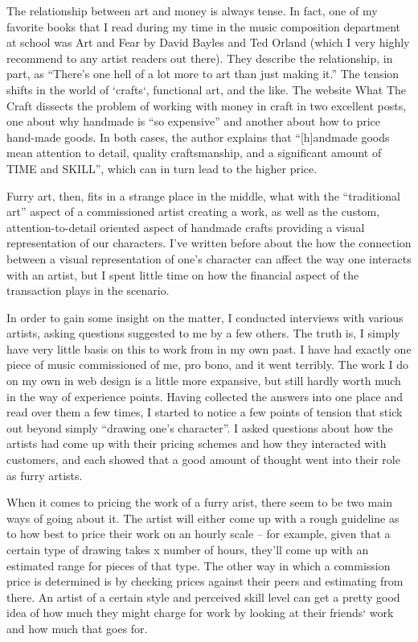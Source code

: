 
The relationship between art and money is always tense. In fact, one of my favorite books that I read during my time in the music composition department at school was Art and Fear by David Bayles and Ted Orland (which I very highly recommend to any artist readers out there).  They describe the relationship, in part, as ``There's one hell of a lot more to art than just making it.''  The tension shifts in the world of `crafts`, functional art, and the like. The website What The Craft dissects the problem of working with money in craft in two excellent posts, one about why handmade is ``so expensive'' and another about how to price hand-made goods.  In both cases, the author explains that ``[h]andmade goods mean attention to detail, quality craftsmanship, and a significant amount of TIME and SKILL'', which can in turn lead to the higher price.

Furry art, then, fits in a strange place in the middle, what with the ``traditional art'' aspect of a commissioned artist creating a work, as well as the custom, attention-to-detail oriented aspect of handmade crafts providing a visual representation of our characters. I've written before about the how the connection between a visual representation of one's character can affect the way one interacts with an artist, but I spent little time on how the financial aspect of the transaction plays in the scenario.

In order to gain some insight on the matter, I conducted interviews with various artists, asking questions suggested to me by a few others.  The truth is, I simply have very little basis on this to work from in my own past.  I have had exactly one piece of music commissioned of me, pro bono, and it went terribly.  The work I do on my own in web design is a little more expansive, but still hardly worth much in the way of experience points.  Having collected the answers into one place and read over them a few times, I started to notice a few points of tension that stick out beyond simply ``drawing one's character''. I asked questions about how the artists had come up with their pricing schemes and how they interacted with customers, and each showed that a good amount of thought went into their role as furry artists.

When it comes to pricing the work of a furry arist, there seem to be two main ways of going about it. The artist will either come up with a rough guideline as to how best to price their work on an hourly scale – for example, given that a certain type of drawing takes x number of hours, they'll come up with an estimated range for pieces of that type. The other way in which a commission price is determined is by checking prices against their peers and estimating from there. An artist of a certain style and perceived skill level can get a pretty good idea of how much they might charge for work by looking at their friends` work and how much that goes for.

